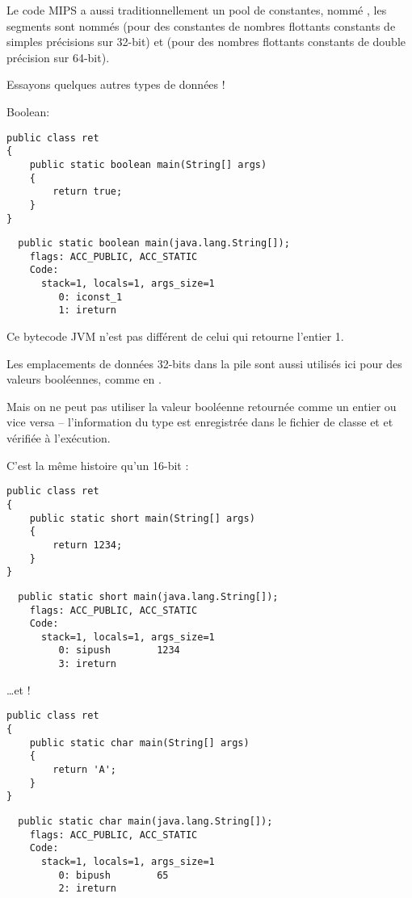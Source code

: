 Le code MIPS a aussi traditionnellement un pool de constantes, nommé , les segments
sont nommés  (pour des constantes de nombres flottants constants de simples précisions sur 32-bit) et 
(pour des nombres flottants constants de double précision sur 64-bit).

Essayons quelques autres types de données !

Boolean:

\begin{lstlisting}[style=customjava]
public class ret
{
	public static boolean main(String[] args) 
	{
		return true;
	}
}
\end{lstlisting}

\begin{lstlisting}
  public static boolean main(java.lang.String[]);
    flags: ACC_PUBLIC, ACC_STATIC
    Code:
      stack=1, locals=1, args_size=1
         0: iconst_1      
         1: ireturn       
\end{lstlisting}

Ce bytecode JVM n'est pas différent de celui qui retourne l'entier 1.

Les emplacements de données 32-bits dans la pile sont aussi utilisés ici pour des valeurs booléennes, comme en \CCpp.

Mais on ne peut pas utiliser la valeur booléenne retournée comme un entier ou vice versa -- l'information du type est enregistrée dans le fichier de classe et et vérifiée à l'exécution.

C'est la même histoire qu'un  16-bit :

\begin{lstlisting}[style=customjava]
public class ret
{
	public static short main(String[] args) 
	{
		return 1234;
	}
}
\end{lstlisting}

\begin{lstlisting}
  public static short main(java.lang.String[]);
    flags: ACC_PUBLIC, ACC_STATIC
    Code:
      stack=1, locals=1, args_size=1
         0: sipush        1234
         3: ireturn       
\end{lstlisting}

\dots et !

\begin{lstlisting}[style=customjava]
public class ret
{
	public static char main(String[] args) 
	{
		return 'A';
	}
}
\end{lstlisting}

\begin{lstlisting}
  public static char main(java.lang.String[]);
    flags: ACC_PUBLIC, ACC_STATIC
    Code:
      stack=1, locals=1, args_size=1
         0: bipush        65
         2: ireturn       
\end{lstlisting}

